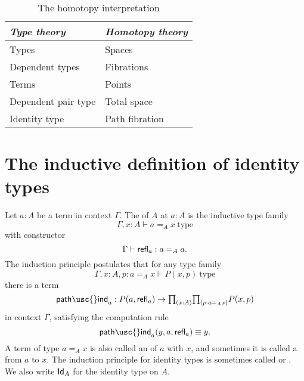 \begin{table}
\begin{center}
\caption{\label{tab:homotopy_interpretation}The homotopy interpretation}
\begin{tabular}{ll}
\toprule
\emph{Type theory} &  \emph{Homotopy theory} \\
\midrule
Types  & Spaces \\
Dependent types & Fibrations \\
Terms & Points \\
Dependent pair type & Total space \\
Identity type & Path fibration\\
\bottomrule
\end{tabular}
\end{center}
\end{table}

\section{The inductive definition of identity types}

Let $a:A$ be a term in context $\Gamma$. The  of $A$ at $a:A$ is the inductive type family 
\begin{equation*}
\Gamma,x:A\vdash a =_A x~\mathrm{type}
\end{equation*}
with constructor
\begin{equation*}
\Gamma\vdash \mathsf{refl}_{a} : a=_A a.
\end{equation*}
The induction principle postulates that for any type family
\begin{equation*}
\Gamma,x:A,p: a=_A x\vdash P(x,p)~\mathrm{type}
\end{equation*}
there is a term
\begin{equation*}
\mathsf{path\usc{}ind}_a : P(a,\refl{a})\to \prd{x:A}{p:a=_A x}P(x,p)
\end{equation*}
in context $\Gamma$, satisfying the computation rule
\begin{equation*}
\mathsf{path\usc{}ind}_a(y,a,\refl{a})\jdeq y.
\end{equation*}
A term of type $a=_A x$ is also called an  of $a$ with $x$, and sometimes it is called a  from $a$ to $x$.
The induction principle for identity types is sometimes called  or . We also write $\mathsf{Id}_{A}$ for the identity type on $A$. 

